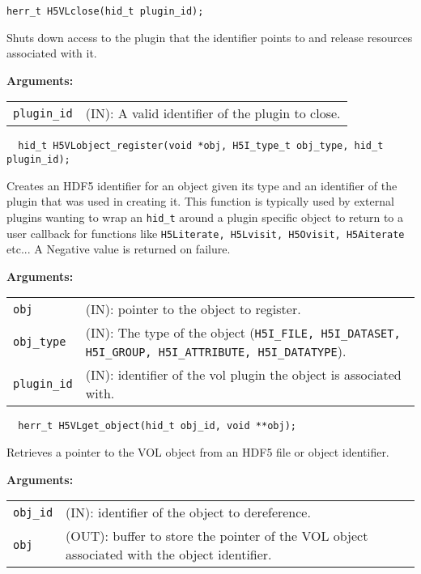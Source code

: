 \begin{lstlisting}
herr_t H5VLclose(hid_t plugin_id);
\end{lstlisting}
Shuts down access to the plugin that the identifier points to and release resources associated with it.

\textbf{Arguments:}\\
\begin{tabular}{l p{10cm}}
 {\tt plugin\_id} & (IN): A valid identifier of the plugin to close.\\
\end{tabular}


\begin{lstlisting}
  hid_t H5VLobject_register(void *obj, H5I_type_t obj_type, hid_t plugin_id);
\end{lstlisting}
Creates an HDF5 identifier for an object given its type and an identifier of the plugin that was used in creating it. This function is typically used by external plugins wanting to wrap an {\tt hid\_t} around a plugin specific object to return to a user callback for functions like {\tt H5Literate, H5Lvisit, H5Ovisit, H5Aiterate} etc... A Negative value is returned on failure.

\textbf{Arguments:}\\
\begin{tabular}{l p{10cm}}
 {\tt obj} & (IN): pointer to the object to register.\\
 {\tt obj\_type} & (IN): The type of the object ({\tt H5I\_FILE, H5I\_DATASET, H5I\_GROUP, H5I\_ATTRIBUTE, H5I\_DATATYPE}).\\
 {\tt plugin\_id} & (IN): identifier of the vol plugin the object is associated with.\\
\end{tabular}


\begin{lstlisting}
  herr_t H5VLget_object(hid_t obj_id, void **obj); 
\end{lstlisting}
Retrieves a pointer to the VOL object from an HDF5 file or object identifier.

\textbf{Arguments:}\\
\begin{tabular}{l p{10cm}}
 {\tt obj\_id} & (IN): identifier of the object to dereference.\\
 {\tt obj} & (OUT): buffer to store the pointer of the VOL object associated with the object identifier.\\
\end{tabular}

